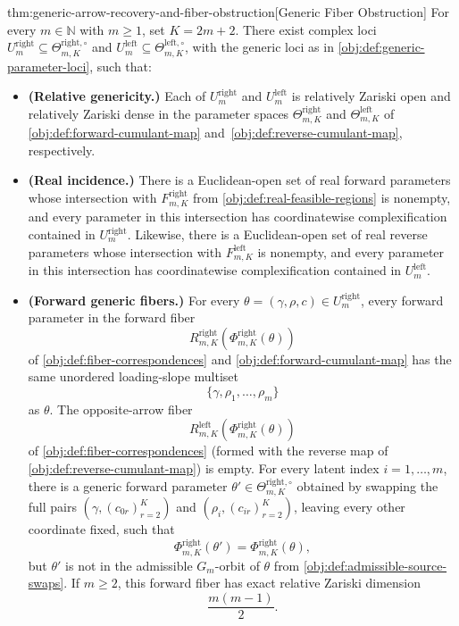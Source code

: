 \begin{theoremv}{thm:generic-arrow-recovery-and-fiber-obstruction}[Generic Fiber Obstruction]
For every \(m\in\mathbb N\) with \(m\ge 1\), set \(K=2m+2\).  There exist complex loci
\(U^{\mathrm{right}}_m\subseteq \Theta^{\mathrm{right},\circ}_{m,K}\) and
\(U^{\mathrm{left}}_m\subseteq \Theta^{\mathrm{left},\circ}_{m,K}\), with the generic loci as in \cref{obj:def:generic-parameter-loci}, such that:
\begin{itemize}
\item \textbf{(Relative genericity.)}  Each of \(U^{\mathrm{right}}_m\) and \(U^{\mathrm{left}}_m\) is relatively Zariski open and relatively Zariski dense in the parameter spaces \(\Theta^{\mathrm{right}}_{m,K}\) and \(\Theta^{\mathrm{left}}_{m,K}\) of \cref{obj:def:forward-cumulant-map} and~\cref{obj:def:reverse-cumulant-map}, respectively.

\item \textbf{(Real incidence.)}  There is a Euclidean-open set of real forward parameters whose intersection with \(F^{\mathrm{right}}_{m,K}\) from \cref{obj:def:real-feasible-regions} is nonempty, and every parameter in this intersection has coordinatewise complexification contained in \(U^{\mathrm{right}}_m\).  Likewise, there is a Euclidean-open set of real reverse parameters whose intersection with \(F^{\mathrm{left}}_{m,K}\) is nonempty, and every parameter in this intersection has coordinatewise complexification contained in \(U^{\mathrm{left}}_m\).

\item \textbf{(Forward generic fibers.)}  For every \(\theta=(\gamma,\rho,c)\in U^{\mathrm{right}}_m\), every forward parameter in the forward fiber
\[
R^{\mathrm{right}}_{m,K}\!\left(\Phi^{\mathrm{right}}_{m,K}(\theta)\right)
\]
of \cref{obj:def:fiber-correspondences} and \cref{obj:def:forward-cumulant-map} has the same unordered loading-slope multiset
\[
\{\gamma,\rho_1,\ldots,\rho_m\}
\]
as \(\theta\).  The opposite-arrow fiber
\[
R^{\mathrm{left}}_{m,K}\!\left(\Phi^{\mathrm{right}}_{m,K}(\theta)\right)
\]
of \cref{obj:def:fiber-correspondences} (formed with the reverse map of \cref{obj:def:reverse-cumulant-map}) is empty.  For every latent index \(i=1,\ldots,m\), there is a generic forward parameter \(\theta'\in\Theta^{\mathrm{right},\circ}_{m,K}\) obtained by swapping the full pairs \((\gamma,(c_{0r})_{r=2}^K)\) and \((\rho_i,(c_{ir})_{r=2}^K)\), leaving every other coordinate fixed, such that
\[
\Phi^{\mathrm{right}}_{m,K}(\theta')
=
\Phi^{\mathrm{right}}_{m,K}(\theta),
\]
but \(\theta'\) is not in the admissible \(G_m\)-orbit of \(\theta\) from \cref{obj:def:admissible-source-swaps}.  If \(m\ge 2\), this forward fiber has exact relative Zariski dimension
\[
\frac{m(m-1)}{2}.
\]


\end{itemize}
\end{theoremv}

